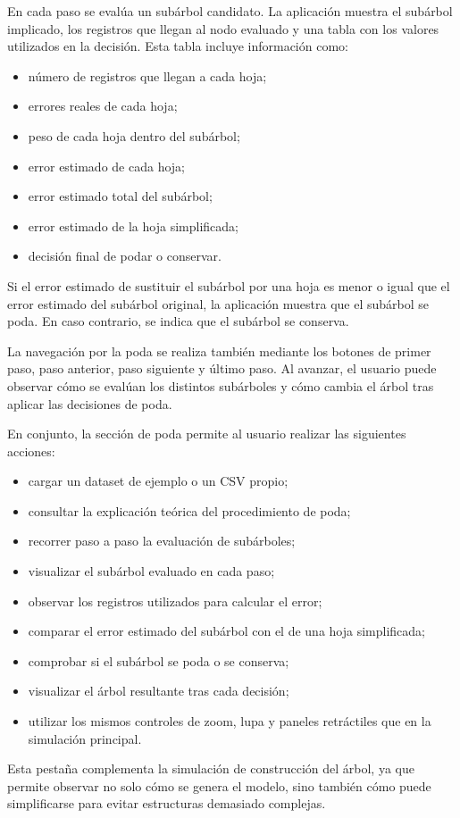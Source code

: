 En cada paso se evalúa un subárbol candidato. La aplicación muestra el subárbol implicado, los registros que llegan al nodo evaluado y una tabla con los valores utilizados en la decisión. Esta tabla incluye información como:

\begin{itemize}
    \item número de registros que llegan a cada hoja;
    \item errores reales de cada hoja;
    \item peso de cada hoja dentro del subárbol;
    \item error estimado de cada hoja;
    \item error estimado total del subárbol;
    \item error estimado de la hoja simplificada;
    \item decisión final de podar o conservar.
\end{itemize}

Si el error estimado de sustituir el subárbol por una hoja es menor o igual que el error estimado del subárbol original, la aplicación muestra que el subárbol se poda. En caso contrario, se indica que el subárbol se conserva.

La navegación por la poda se realiza también mediante los botones de primer paso, paso anterior, paso siguiente y último paso. Al avanzar, el usuario puede observar cómo se evalúan los distintos subárboles y cómo cambia el árbol tras aplicar las decisiones de poda.

En conjunto, la sección de poda permite al usuario realizar las siguientes acciones:

\begin{itemize}
    \item cargar un dataset de ejemplo o un CSV propio;
    \item consultar la explicación teórica del procedimiento de poda;
    \item recorrer paso a paso la evaluación de subárboles;
    \item visualizar el subárbol evaluado en cada paso;
    \item observar los registros utilizados para calcular el error;
    \item comparar el error estimado del subárbol con el de una hoja simplificada;
    \item comprobar si el subárbol se poda o se conserva;
    \item visualizar el árbol resultante tras cada decisión;
    \item utilizar los mismos controles de zoom, lupa y paneles retráctiles que en la simulación principal.
\end{itemize}

Esta pestaña complementa la simulación de construcción del árbol, ya que permite observar no solo cómo se genera el modelo, sino también cómo puede simplificarse para evitar estructuras demasiado complejas.